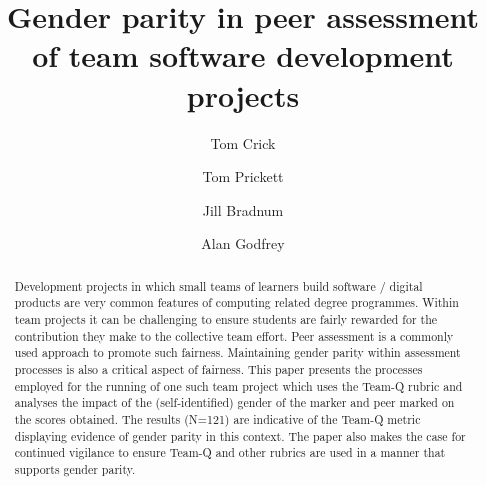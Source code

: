 \documentclass[sigconf, anonymous=true]{acmart}
\begin{document}
\title{Gender parity in peer assessment of team software development projects}

\author{Tom Crick}


\author{Tom Prickett}

\author{Jill Bradnum}

\author{Alan Godfrey}
\renewcommand{\shortauthors}{Crick and Prickett, et al.}

\begin{abstract}
 Development projects in which small teams of learners build software / digital products are very common features of computing related degree programmes. Within team projects it can be challenging to ensure students are fairly rewarded for the contribution they make to the collective team effort. Peer assessment is a commonly used approach to promote such fairness. Maintaining gender parity within assessment processes is also a critical aspect of fairness. This paper presents the processes employed for the running of one such team project which uses the Team-Q rubric and analyses the impact of the (self-identified) gender of the marker and peer marked on the scores obtained. The results (N=121) are indicative of the Team-Q metric displaying evidence of gender parity in this context. The paper also makes the case for continued vigilance to ensure Team-Q and other rubrics are used in a manner that supports gender parity. 
\end{abstract}
\end{document}

